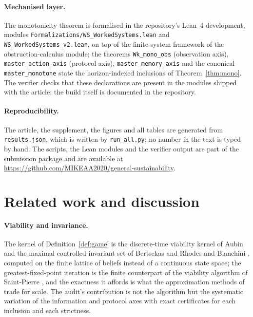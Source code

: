\documentclass[11pt,a4paper]{article}
\theoremstyle{plain}
\theoremstyle{definition}
\theoremstyle{remark}
\begin{document}
\paragraph{Mechanised layer.}
The monotonicity theorem is formalised in the repository's Lean~4 development, modules \texttt{Formalizations/WS\_WorkedSystems.lean} and \texttt{WS\_WorkedSystems\_v2.lean}, on top of the finite-system framework of the obstruction-calculus module; the theorems \texttt{Wk\_mono\_obs} (observation axis), \texttt{master\_action\_axis} (protocol axis), \texttt{master\_memory\_axis} and the canonical \texttt{master\_monotone} state the horizon-indexed inclusions of Theorem~\ref{thm:mono}. The verifier checks that these declarations are present in the modules shipped with the article; the build itself is documented in the repository.

\paragraph{Reproducibility.}
The article, the supplement, the figures and all tables are generated from \texttt{results.json}, which is written by \texttt{run\_all.py}; no number in the text is typed by hand. The scripts, the Lean modules and the verifier output are part of the submission package and are available at \url{https://github.com/MIKEAA2020/general-sustainability}.
\section{Related work and discussion}\label{sec:related}

\paragraph{Viability and invariance.}
The kernel of Definition~\ref{def:game} is the discrete-time viability kernel of Aubin \cite{Aubin1991} and the maximal controlled-invariant set of Bertsekas and Rhodes \cite{BertsekasRhodes1971} and Blanchini \cite{Blanchini1999}, computed on the finite lattice of beliefs instead of a continuous state space; the greatest-fixed-point iteration is the finite counterpart of the viability algorithm of Saint-Pierre \cite{SaintPierre1994}, and the exactness it affords is what the approximation methods of \cite{Deffuant2007} trade for scale. The audit's contribution is not the algorithm but the systematic variation of the information and protocol axes with exact certificates for each inclusion and each strictness.
\end{document}
